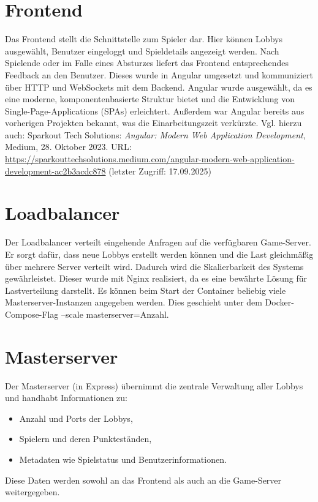 \section{Frontend}
Das Frontend stellt die Schnittstelle zum Spieler dar. 
Hier können Lobbys ausgewählt, Benutzer eingeloggt und Spieldetails angezeigt werden. 
Nach Spielende oder im Falle eines Absturzes liefert das Frontend entsprechendes Feedback an den Benutzer.
Dieses wurde in Angular umgesetzt und kommuniziert über HTTP und WebSockets mit dem Backend.
Angular wurde ausgewählt, da es eine moderne, komponentenbasierte Struktur bietet und die Entwicklung von Single-Page-Applications (SPAs) erleichtert. 
Außerdem war Angular bereits aus vorherigen Projekten bekannt, was die Einarbeitungszeit verkürzte.
\noindent
Vgl. hierzu auch:  
Sparkout Tech Solutions: \textit{Angular: Modern Web Application Development}, Medium, 28. Oktober 2023.  
URL: \url{https://sparkouttechsolutions.medium.com/angular-modern-web-application-development-ac2b3acdc878} (letzter Zugriff: 17.09.2025)


\section{Loadbalancer}
Der Loadbalancer verteilt eingehende Anfragen auf die verfügbaren Game-Server. 
Er sorgt dafür, dass neue Lobbys erstellt werden können und die Last gleichmäßig über mehrere Server verteilt wird. 
Dadurch wird die Skalierbarkeit des Systems gewährleistet.
Dieser wurde mit Nginx realisiert, da es eine bewährte Lösung für Lastverteilung darstellt. 
Es können beim Start der Container beliebig viele Masterserver-Instanzen angegeben werden. 
Dies geschieht unter dem Docker-Compose-Flag --scale masterserver=Anzahl. 

\section{Masterserver}
Der Masterserver (in Express) übernimmt die zentrale Verwaltung aller Lobbys und handhabt Informationen zu:
\begin{itemize}
  \item Anzahl und Ports der Lobbys,
  \item Spielern und deren Punkteständen,
  \item Metadaten wie Spielstatus und Benutzerinformationen.
\end{itemize}
Diese Daten werden sowohl an das Frontend als auch an die Game-Server weitergegeben.

